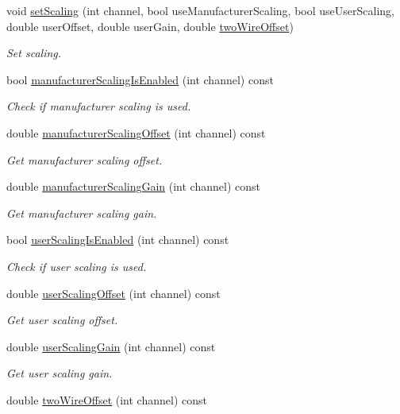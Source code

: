 \begin{DoxyCompactItemize}
void \hyperlink{classmdt_device_modbus_wago_module_rtd_a67ab613e399574816cc9df0b7eca0496}{set\-Scaling} (int channel, bool use\-Manufacturer\-Scaling, bool use\-User\-Scaling, double user\-Offset, double user\-Gain, double \hyperlink{classmdt_device_modbus_wago_module_rtd_a110c774e640f45309e1f14a8b65a7b0e}{two\-Wire\-Offset})
\begin{DoxyCompactList}\small\item\em Set scaling. \end{DoxyCompactList}\item 
bool \hyperlink{classmdt_device_modbus_wago_module_rtd_a1e2cc22d3edb80b4f086575adea75e6b}{manufacturer\-Scaling\-Is\-Enabled} (int channel) const 
\begin{DoxyCompactList}\small\item\em Check if manufacturer scaling is used. \end{DoxyCompactList}\item 
double \hyperlink{classmdt_device_modbus_wago_module_rtd_aa0b24b290c75132ccf6a964b51b9c8c4}{manufacturer\-Scaling\-Offset} (int channel) const 
\begin{DoxyCompactList}\small\item\em Get manufacturer scaling offset. \end{DoxyCompactList}\item 
double \hyperlink{classmdt_device_modbus_wago_module_rtd_a39989cd76ae2195d0dec147ca128a96a}{manufacturer\-Scaling\-Gain} (int channel) const 
\begin{DoxyCompactList}\small\item\em Get manufacturer scaling gain. \end{DoxyCompactList}\item 
bool \hyperlink{classmdt_device_modbus_wago_module_rtd_a6144f959f5ecb425d1526871ef99a4d0}{user\-Scaling\-Is\-Enabled} (int channel) const 
\begin{DoxyCompactList}\small\item\em Check if user scaling is used. \end{DoxyCompactList}\item 
double \hyperlink{classmdt_device_modbus_wago_module_rtd_a0a1c2980fe4b3b0fb774b1f41280d890}{user\-Scaling\-Offset} (int channel) const 
\begin{DoxyCompactList}\small\item\em Get user scaling offset. \end{DoxyCompactList}\item 
double \hyperlink{classmdt_device_modbus_wago_module_rtd_a5bf6697432dc475533db1e36889a6ad4}{user\-Scaling\-Gain} (int channel) const 
\begin{DoxyCompactList}\small\item\em Get user scaling gain. \end{DoxyCompactList}\item 
double \hyperlink{classmdt_device_modbus_wago_module_rtd_a110c774e640f45309e1f14a8b65a7b0e}{two\-Wire\-Offset} (int channel) const 
\end{DoxyCompactItemize}
